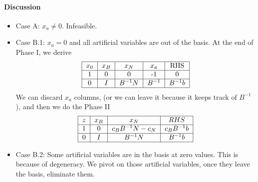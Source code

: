                \paragraph{Discussion}
                    \begin{itemize}
                        \item Case A: $x_a \ne 0$. Infeasible.
                        \item Case B.1: $x_a = 0$ and all artificial variables are out of the basis. At the end of Phase I, we derive
                        \begin{align}
                            \begin{tabular} {|c|c|c|c|c|}
                                \hline
                                $x_0$ & $x_B$ & $x_N$ & $x_a$ & RHS \\
                                \hline
                                1 & 0 & 0 & -1 & 0\\
                                \hline
                                0 & $I$ & $B^{-1}N$ & $B^{-1}$ & $B^{-1}b$ \\
                                \hline
                            \end{tabular} \nonumber
                        \end{align}
                        We can discard $x_a$ columns, (or we can leave it because it keeps track of $B^{-1}$), and then we do the Phase II
                        \begin{align}
                            \begin{tabular} {|c|c|c|c|}
                                \hline
                                $z$ & $x_B$ & $x_N$ & $RHS$ \\
                                \hline
                                1 & 0 & $c_BB^{-1}N - c_N$ & $c_BB^{-1}b$ \\
                                \hline
                                0 & $I$ & $B^{-1}N$ & $B^{-1}b$ \\
                                \hline
                            \end{tabular} \nonumber     
                        \end{align}
                        \item Case B.2: Some artificial variables are in the basis at zero values. This is because of degeneracy. We pivot on those artificial variables, once they leave the basis, eliminate them.
                    \end{itemize}

